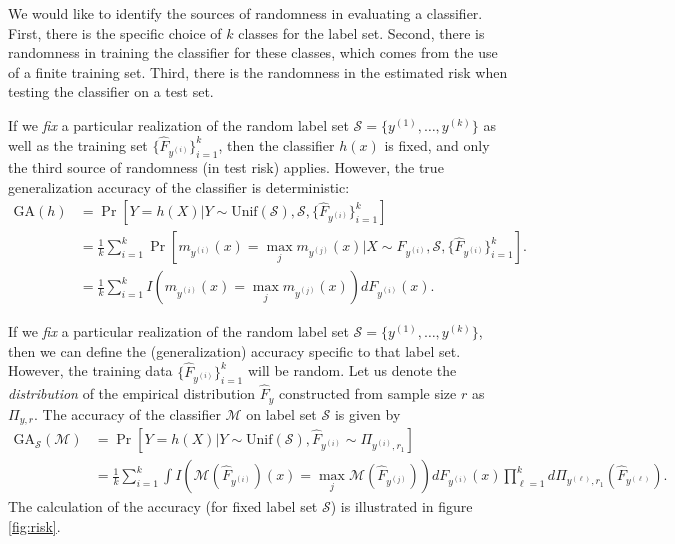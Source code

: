 We would like to identify the sources of randomness in evaluating a
classifier.  First, there is the specific choice of $k$ classes for
the label set.   Second, there is randomness in training the classifier
for these classes, which comes from the use of a finite training
set. Third, there is the randomness in the estimated risk when
testing the classifier on a test set.

If we \emph{fix} a particular realization of the random label set
$\mathcal{S} = \{y^{(1)}, \hdots, y^{(k)}\}$ as well as the training
set $\{\hat{F}_{y^{(i)}}\}_{i=1}^k$, then the classifier $h(x)$ is
fixed, and only the third source of randomness (in test risk) applies.
However, the true generalization accuracy of the classifier is deterministic:
\begin{align*}
\text{GA}(h) &= \Pr[Y = h(X)|Y \sim \text{Unif}(\mathcal{S}),
  \mathcal{S}, \{\hat{F}_{y^{(i)}}\}_{i=1}^k] 
\\&= \frac{1}{k}
\sum_{i=1}^k \Pr[m_{y^{(i)}}(x) = \max_j m_{y^{(j)}}(x)|X \sim
  F_{y^{(i)}}, \mathcal{S}, \{\hat{F}_{y^{(i)}}\}_{i=1}^k].  
\\&= \frac{1}{k}
\sum_{i=1}^k I(m_{y^{(i)}}(x) = \max_j m_{y^{(j)}}(x)) dF_{y^{(i)}}(x).
\end{align*}

If we \emph{fix} a particular realization of the random label set
$\mathcal{S} = \{y^{(1)}, \hdots, y^{(k)}\}$, then we can define the
(generalization) accuracy specific to that label set.  However, the
training data $\{\hat{F}_{y^{(i)}}\}_{i=1}^k$ will be random.  Let us
denote the \emph{distribution} of the empirical distribution
$\hat{F}_y$ constructed from sample size $r$ as $\Pi_{y, r}$.  The
accuracy of the classifier $\mathcal{M}$ on label set $\mathcal{S}$ is
given by
\begin{align*}
\text{GA}_{\mathcal{S}}(\mathcal{M}) &= \Pr[Y = h(X)|Y \sim
  \text{Unif}(\mathcal{S}), \hat{F}_{y^{(i)}} \sim \Pi_{y^{(i)}, r_1}] \\&= \frac{1}{k} \sum_{i=1}^k \int
I(\mathcal{M}(\hat{F}_{y^{(i)}})(x) = \max_j
\mathcal{M}(\hat{F}_{y^{(j)}})) dF_{y^{(i)}}(x) \prod_{\ell=1}^k
d\Pi_{y^{(\ell)}, r_1}(\hat{F}_{y^{(\ell)}}).
\end{align*}
The calculation of the accuracy (for fixed label set $\mathcal{S}$) is
illustrated in figure \ref{fig:risk}.

